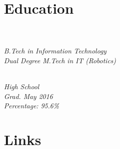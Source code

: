 \documentclass[]{deedy-resume-openfont}
\begin{document}
%
%

%
%






%
%

\begin{minipage}[t]{0.33\textwidth} 


\section{Education} 

\\
\textit{\\B.Tech in Information Technology\\ Dual Degree M.Tech in IT (Robotics)}\\ 
\sectionsep

\\
\textit{High School\\Grad. May 2016\\ Percentage: 95.6\%\\}
\sectionsep


\section{Links} 
\faGithub \href{https://github.com/Ellusionists}{} \\
\faLinkedin  \href{https://www.linkedin.com/in/aditya-goel-11a578134/}{} \\
\faTwitter \href{https://twitter.com/itsAdityaGoel}{} \\
\sectionsep


\end{minipage}
\end{document}
